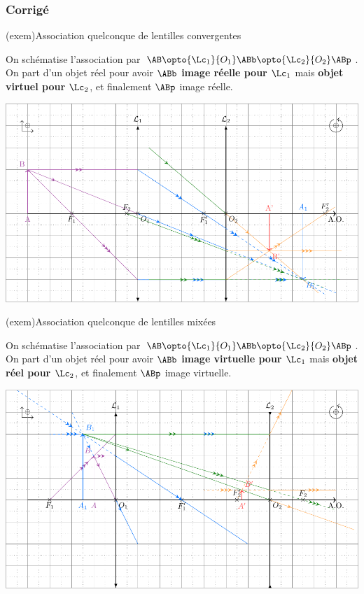 \documentclass[../../main/main.tex]{subfiles}
\begin{document}
\subsubsection{Corrigé}

\begin{tcb}[label=exem:asso_lent](exem){Association quelconque de lentilles
			convergentes}

	On schématise l'association par $\AB \opto{\Lc_1}{O_1} \ABb
		\opto{\Lc_2}{O_2} \ABp$. On part d'un objet réel pour avoir $\ABb$
	\textbf{image réelle pour $\Lc_1$} mais \textbf{objet virtuel pour $\Lc_2$},
	et finalement $\ABp$ image réelle.

	\tcblower
	\begin{center}
		\includegraphics[width=.85\linewidth]{asso_lent-a.pdf}
		\label{fig:asso_lent-conv}
	\end{center}
\end{tcb}
\begin{tcb}[label=exem:asso_lent](exem){Association quelconque de lentilles
			mixées}

	On schématise l'association par $\AB \opto{\Lc_1}{O_1} \ABb
		\opto{\Lc_2}{O_2} \ABp$. On part d'un objet réel pour avoir $\ABb$
	\textbf{image virtuelle pour $\Lc_1$} mais \textbf{objet réel pour $\Lc_2$},
	et finalement $\ABp$ image virtuelle.

	\tcblower
	\begin{center}
		\includegraphics[width=.85\linewidth]{asso_lent-b.pdf}
		\label{fig:asso_lent-mix}
	\end{center}
\end{tcb}
\end{document}
